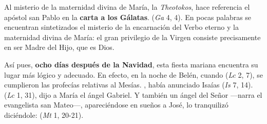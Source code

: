Al misterio de la maternidad divina de María, la \emph{Theotokos}, hace referencia el apóstol san Pablo en la \textbf{carta a los Gálatas}.  (\emph{Ga} 4, 4). En pocas palabras se encuentran sintetizados el misterio de la encarnación del Verbo eterno y la maternidad divina de María: el gran privilegio de la Virgen consiste precisamente en ser Madre del Hijo, que es Dios.

Así pues, \textbf{ocho días después de la Navidad}, esta fiesta mariana encuentra su lugar más lógico y adecuado. En efecto, en la noche de Belén, cuando  (\emph{Lc} 2, 7), se cumplieron las profecías relativas al Mesías. , había anunciado Isaías (\emph{Is} 7, 14).  (\emph{Lc} 1, 31), dijo a María el ángel Gabriel. Y también un ángel del Señor ---narra el evangelista san Mateo---, apareciéndose en sueños a José, lo tranquilizó diciéndole:  (\emph{Mt} 1, 20-21).

